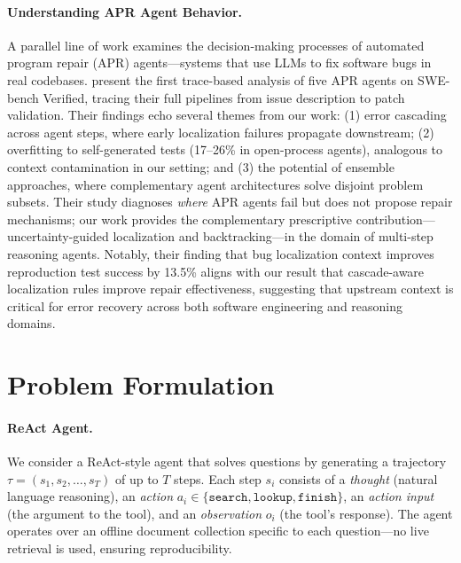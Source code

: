 \documentclass[letterpaper]{article}
\begin{document}
\paragraph{Understanding APR Agent Behavior.}
A parallel line of work examines the decision-making processes of automated program repair (APR) agents---systems that use LLMs to fix software bugs in real codebases. \citet{ceka2026understanding} present the first trace-based analysis of five APR agents on SWE-bench Verified, tracing their full pipelines from issue description to patch validation. Their findings echo several themes from our work: (1) error cascading across agent steps, where early localization failures propagate downstream; (2) overfitting to self-generated tests (17--26\% in open-process agents), analogous to context contamination in our setting; and (3) the potential of ensemble approaches, where complementary agent architectures solve disjoint problem subsets. Their study diagnoses \emph{where} APR agents fail but does not propose repair mechanisms; our work provides the complementary prescriptive contribution---uncertainty-guided localization and backtracking---in the domain of multi-step reasoning agents. Notably, their finding that bug localization context improves reproduction test success by 13.5\% aligns with our result that cascade-aware localization rules improve repair effectiveness, suggesting that upstream context is critical for error recovery across both software engineering and reasoning domains.

\section{Problem Formulation}

\paragraph{ReAct Agent.} We consider a ReAct-style agent that solves questions by generating a trajectory $\tau = (s_1, s_2, \ldots, s_T)$ of up to $T$ steps. Each step $s_i$ consists of a \emph{thought} (natural language reasoning), an \emph{action} $a_i \in \{\texttt{search}, \texttt{lookup}, \texttt{finish}\}$, an \emph{action input} (the argument to the tool), and an \emph{observation} $o_i$ (the tool's response). The agent operates over an offline document collection specific to each question---no live retrieval is used, ensuring reproducibility.
\end{document}
